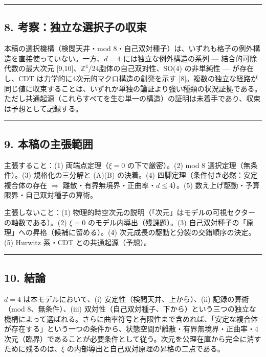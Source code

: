 \documentclass[
]{ltjsarticle}
\begin{document}
\begin{center}\rule{0.5\linewidth}{0.5pt}\end{center}

\subsection{8.
考察：独立な選択子の収束}\label{ux8003ux5bdfux72ecux7acbux306aux9078ux629eux5b50ux306eux53ceux675f}

本稿の選択機構（検閲天井・mod
8・自己双対種子）は、いずれも格子の例外構造を直接使っていない。一方、\(d=4\)
には独立な例外構造の系列 --- 結合的可除代数の最大次元
{[}9,10{]}、\(\mathbb{Z}^4\)/24胞体の自己双対性、SO(4) の非単純性 ---
が存在し、CDT は力学的に4次元的マクロ構造の創発を示す
{[}8{]}。複数の独立な経路が同じ値に収束することは、いずれか単独の論証より強い種類の状況証拠である。ただし共通起源（これらすべてを生む単一の構造）の証明は未着手であり、収束は予想として記録する。

\begin{center}\rule{0.5\linewidth}{0.5pt}\end{center}

\subsection{9.
本稿の主張範囲}\label{ux672cux7a3fux306eux4e3bux5f35ux7bc4ux56f2}

主張すること：(1) 両端点定理（\(\xi=0\) の下で厳密）。(2) mod 8
選択定理（無条件）。(3) 規格化の三分解と (A)(B) の決着。(4)
四脚定理（条件付き必然：安定複合体の存在 $\Longrightarrow$
離散・有界無境界・正曲率・\(d\le4\)）。(5)
数え上げ駆動・予算限界・自己双対種子の算術。

主張しないこと：(1)
物理的時空次元の説明（「次元」はモデルの可視セクターの軸数である）。(2)
\(\xi=0\) のモデル内導出（残課題）。(3)
自己双対種子の「原理」への昇格（候補に留める）。(4)
次元成長の駆動と分裂の交錯順序の決定。(5) Hurwitz 系・CDT
との共通起源（予想）。

\begin{center}\rule{0.5\linewidth}{0.5pt}\end{center}

\subsection{10. 結論}\label{ux7d50ux8ad6}

\(d=4\) は本モデルにおいて、(i) 安定性（検閲天井、上から）、(ii)
記録の算術（mod 8、無条件）、(iii)
双対性（自己双対種子、下から）という三つの独立な機構によって選ばれる。さらに曲率符号と有限性まで含めれば、「安定な複合体が存在する」という一つの条件から、状態空間が離散・有界無境界・正曲率・4次元（臨界）であることが必要条件として従う。次元を公理在庫から完全に消すために残るのは、\(\xi\)
の内部導出と自己双対原理の昇格の二点である。
\end{document}
